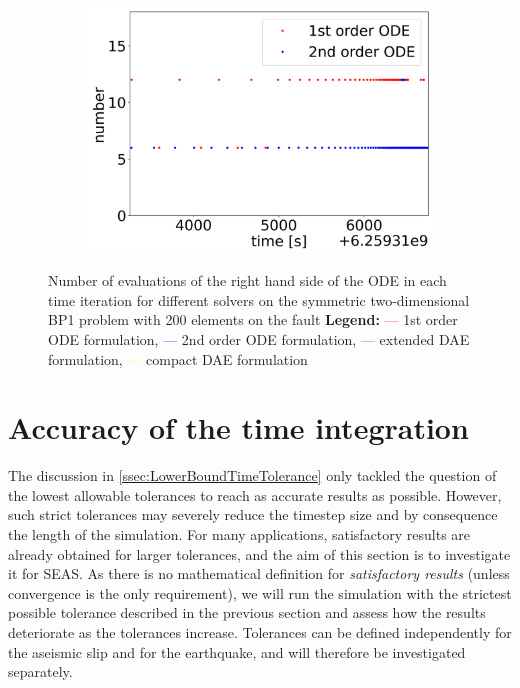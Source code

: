 \begin{figure}[H]
\begin{subfigure}{0.32\textwidth}
    	\includegraphics[width=1\textwidth]{images/TANDEMcompareFormulationstimeEvolutionRHSearthquake.png}
    \end{subfigure}
    \caption{Number of evaluations of the right hand side of the ODE in each time iteration for different solvers on the symmetric two-dimensional BP1 problem with 200 elements on the fault \newline
    \textbf{Legend:} \textcolor{red}{---} 1st order ODE formulation, \textcolor{blue}{---} 2nd order ODE formulation, \textcolor{green}{---} extended DAE formulation, \textcolor{yellow}{---} compact DAE formulation }
    \label{fig:timeEvolutionTANDEM_RHS}
\end{figure}


\section{Accuracy of the time integration}
\label{sec:Results_AccuracyTimeIntegration}
The discussion in \autoref{ssec:LowerBoundTimeTolerance} only tackled the question of the lowest allowable tolerances to reach as accurate results as possible. However, such strict tolerances may severely reduce the timestep size and by consequence the length of the simulation. For many applications, satisfactory results are already obtained for larger tolerances, and the aim of this section is to investigate it for SEAS. As there is no mathematical definition for \textit{satisfactory results} (unless convergence is the only requirement), we will run the simulation with the strictest possible tolerance described in the previous section and assess how the results deteriorate as the tolerances increase. Tolerances can be defined independently for the 
aseismic slip and for the earthquake, and will therefore be investigated separately. \\

